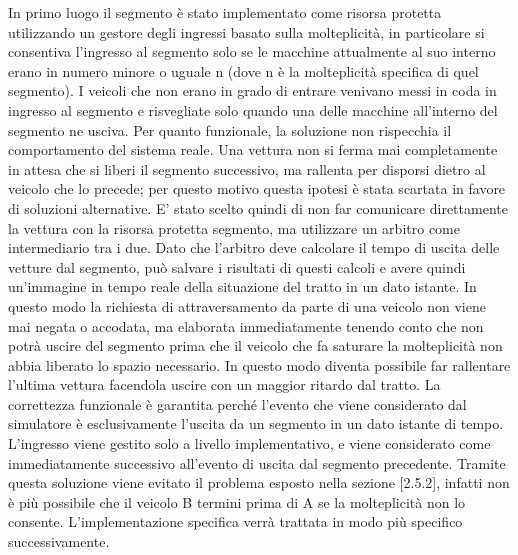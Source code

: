 In primo luogo il segmento è stato implementato come risorsa protetta utilizzando un gestore degli ingressi basato sulla molteplicità, in particolare si consentiva l'ingresso al segmento solo se le macchine attualmente al suo interno erano in numero minore o uguale n (dove n è la molteplicità specifica di quel segmento). I veicoli che non erano in grado di entrare venivano messi in coda in ingresso al segmento e risvegliate solo quando una delle macchine all'interno del segmento ne usciva.
Per quanto funzionale, la soluzione non rispecchia il comportamento del sistema reale. Una vettura non si ferma mai completamente in attesa che si liberi il segmento successivo, ma rallenta per disporsi dietro al veicolo che lo precede; per questo motivo questa ipotesi è stata scartata in favore di soluzioni alternative.
E' stato scelto quindi di non far comunicare direttamente la vettura con la risorsa protetta segmento, ma utilizzare un arbitro come intermediario tra i due. Dato che l'arbitro deve calcolare il tempo di uscita delle vetture dal segmento, può salvare i risultati di questi calcoli e avere quindi un'immagine in tempo reale della situazione del tratto in un dato istante. In questo modo la richiesta di attraversamento da parte di una veicolo non viene mai negata o accodata, ma elaborata immediatamente tenendo conto che non potrà uscire del segmento prima che il veicolo che fa saturare la molteplicità non abbia liberato lo spazio necessario. In questo modo diventa possibile far rallentare l'ultima vettura facendola uscire con un maggior ritardo dal tratto.
La correttezza funzionale è garantita perché l'evento che viene considerato dal simulatore è esclusivamente l'uscita da un segmento in un dato istante di tempo. L'ingresso viene gestito solo a livello implementativo, e viene considerato come immediatamente successivo all'evento di uscita dal segmento precedente.
Tramite questa soluzione viene evitato il problema esposto nella sezione [2.5.2], infatti non è più possibile che il veicolo B termini prima di A se la molteplicità non lo consente.
L'implementazione specifica verrà trattata in modo più specifico successivamente.
